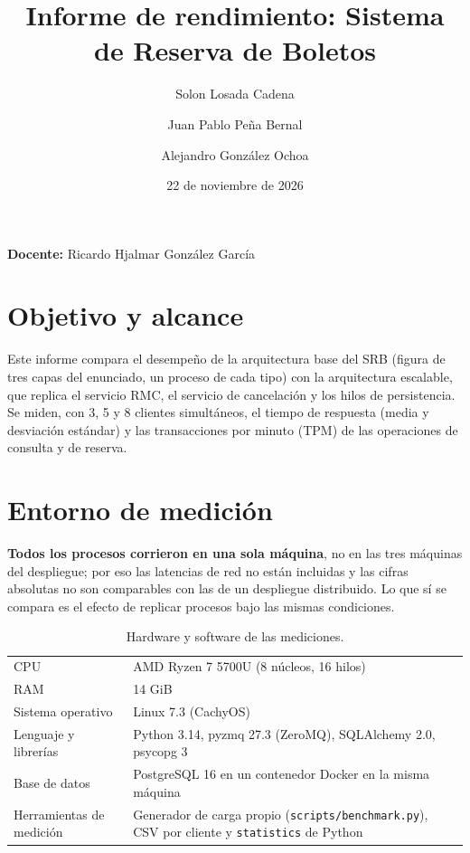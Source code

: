 \documentclass[10pt, a4paper]{article}
\title{\Large \textbf{Informe de rendimiento: Sistema de Reserva de Boletos}}
\author[1]{Solon Losada Cadena}
\author[1]{Juan Pablo Peña Bernal}
\author[1]{Alejandro González Ochoa}
\affil[1]{Departamento de Ingeniería de Sistemas, Pontificia Universidad Javeriana, Bogotá, Colombia.}
\date{22 de noviembre de 2026}
\begin{document}
\maketitle
\vspace{-1.2cm}
\begin{center}
	\small \textbf{Docente:} Ricardo Hjalmar González García
\end{center}

\section{Objetivo y alcance}
Este informe compara el desempeño de la arquitectura base del SRB (figura de tres capas del enunciado, un proceso de cada tipo) con la arquitectura escalable, que replica el servicio RMC, el servicio de cancelación y los hilos de persistencia. Se miden, con 3, 5 y 8 clientes simultáneos, el tiempo de respuesta (media y desviación estándar) y las transacciones por minuto (TPM) de las operaciones de consulta y de reserva.

\section{Entorno de medición}
\label{sec:entorno}
\textbf{Todos los procesos corrieron en una sola máquina}, no en las tres máquinas del despliegue; por eso las latencias de red no están incluidas y las cifras absolutas no son comparables con las de un despliegue distribuido. Lo que sí se compara es el efecto de replicar procesos bajo las mismas condiciones.

\begin{table}[H]
	\centering\small
	\begin{tabular}{@{}ll@{}}
		\toprule
		CPU & AMD Ryzen 7 5700U (8 núcleos, 16 hilos) \\
		RAM & 14 GiB \\
		Sistema operativo & Linux 7.3 (CachyOS) \\
		Lenguaje y librerías & Python 3.14, pyzmq 27.3 (ZeroMQ), SQLAlchemy 2.0, psycopg 3 \\
		Base de datos & PostgreSQL 16 en un contenedor Docker en la misma máquina \\
		Herramientas de medición & Generador de carga propio (\texttt{scripts/benchmark.py}), CSV por cliente y \texttt{statistics} de Python \\
		\bottomrule
	\end{tabular}
	\caption{Hardware y software de las mediciones.}
\end{table}
\end{document}

